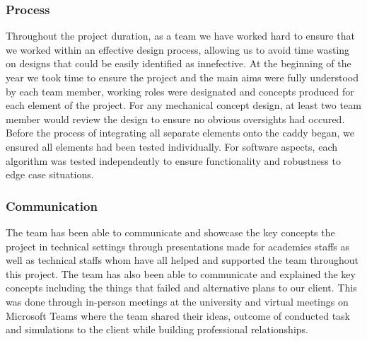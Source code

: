 \documentclass[11pt,landscape]{article}
\begin{document}
\begin{multicols}{3}
\subsubsection{Process}
Throughout the project duration, as a team we have worked hard to ensure that we
worked within an effective design process, allowing us to avoid time wasting on
designs that could be easily identified as innefective. At the beginning of the
year we took time to ensure the project and the main aims were fully understood
by each team member, working roles were designated and concepts produced for
each element of the project. For any mechanical concept design, at least two
team member would review the design to ensure no obvious oversights had occured.
Before the process of integrating all separate elements onto the caddy began, we
ensured all elements had been tested individually. For software aspects, each
algorithm was tested independently to ensure functionality and robustness to
edge case situations. 


\subsubsection{Communication}
The team has been able to communicate and showcase the key concepts the project
in technical settings through presentations made for academics staffs as well as
technical staffs whom have all helped and supported the team throughout this
project. The team has also been able to communicate and explained the key
concepts including the things that failed and alternative plans to our client.
This was done through in-person meetings at the university and virtual meetings
on Microsoft Teams where the team shared their ideas, outcome of conducted task
and simulations to the client while building professional relationships.

\nocite{*}



\end{multicols}
\appendix
\end{document}
